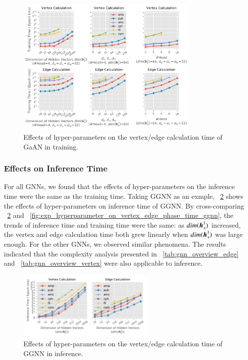 \begin{figure}[H]
    \centering
    \includegraphics[width=0.8\textwidth]{figs/experiments/exp_hyperparameter_on_vertex_edge_phase_time_gaan.pdf}
    \caption{Effects of hyper-parameters on the vertex/edge calculation time of GaAN in training.}
    \label{fig:exp_hyperparameter_on_vertex_edge_phase_time_gaan}
\end{figure}

\subsubsection{Effects on Inference Time}

For all GNNs, we found that the effects of hyper-parameters on the inference time were the same as the training time.
%
Taking GGNN as an exmple, \figurename~\ref{fig:exp_hyperparameter_on_inference_vertex_edge_phase_time_ggnn} shows the effects of hyper-parameters on inference time of GGNN.
%
By cross-comparing \figurename~\ref{fig:exp_hyperparameter_on_inference_vertex_edge_phase_time_ggnn} and \figurename~\ref{fig:exp_hyperparameter_on_vertex_edge_phase_time_ggnn}, the trends of inference time and training time were the same: as $dim(\boldsymbol{h}^1_x)$ increased, the vertex and edge calculation time both grew linearly when $dim(\boldsymbol{h}^1_x)$ was large enough.
%
For the other GNNs, we observed similar phenomena.
%
The results indicated that the complexity analysis presented in \tablename~\ref{tab:gnn_overview_edge} and \tablename~\ref{tab:gnn_overview_vertex} were also applicable to inference.

\begin{figure}[H]
    \centering
    \includegraphics[width=0.6\textwidth]{figs/experiments/exp_hyperparameter_on_inference_vertex_edge_phase_time_ggnn.pdf}
    \caption{Effects of hyper-parameters on the vertex/edge calculation time of GGNN in inference.}
    \label{fig:exp_hyperparameter_on_inference_vertex_edge_phase_time_ggnn}
\end{figure}


